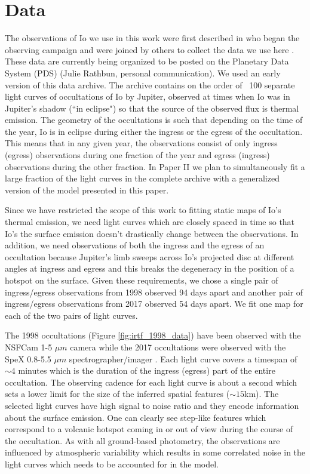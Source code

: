 \documentclass[linenumbers,modern]{aastex62}
\begin{document}
\section{Data}
\label{sec:data}
The observations of Io we use in this work were first described in \cite{spencer1994} who began the observing campaign and were joined by others to collect the data we use here \citep{stansberry1997,rathbun2002,rathbun2006,rathbun2010,tate2020}. 
These data are currently being organized to be posted on the Planetary Data System (PDS) (Julie Rathbun, personal communication).  
We used an early version of this data archive.
The archive contains on the order of ~100 separate light curves of occultations of Io by Jupiter, observed at times when Io was in Jupiter's shadow (``in eclipse") so that the source of the observed flux is thermal emission.
The geometry of the occultations is such that depending on the time of the year, Io is in eclipse during either the ingress or the egress of the occultation.
This means that in any given year, the observations consist of only ingress (egress) observations during one fraction of the year and egress (ingress) observations during the other fraction. 
In Paper II we plan to simultaneously fit a large fraction of the light curves in the complete archive with a generalized version of the model presented in this paper.

Since we have restricted the scope of this work to fitting static maps of Io's thermal emission, we need light curves which are closely spaced in time so that Io's the surface emission doesn't drastically change between the observations.
In addition, we need observations of both the ingress and the egress of an occultation  because Jupiter's limb sweeps across Io's projected disc at different angles at ingress and egress and this breaks the degeneracy in the position of a hotspot on the surface.
Given these requirements, we chose a single pair of ingress/egress observations from 1998 observed 94 days apart and another pair of ingress/egress observations from 2017 observed 54 days apart.
We fit one map for each of the two pairs of light curves.

The 1998 occultations (Figure \ref{fig:irtf_1998_data}) have been observed with the NSFCam 1-5 $\mu m$ camera \citep{shure1994} while the 2017 occultations were observed with the SpeX 0.8-5.5 $\mu m$ spectrographer/imager \citep{rayner2003}.
Each light curve covers a timespan of $\sim 4$ minutes which is the duration of the ingress (egress) part of the entire occultation.
The observing cadence for each light curve is about a second which sets a lower limit for the size of the inferred spatial features ($\sim 15$km).
The selected light curves have high signal to noise ratio and they encode information about the surface emission.
One can clearly see step-like features which correspond to a volcanic hotspot coming in or out of view during the course of the occultation.
As with all ground-based photometry, the observations are influenced by atmospheric variability which results in some correlated noise in the light curves which needs to be accounted for in the model.
\end{document}
